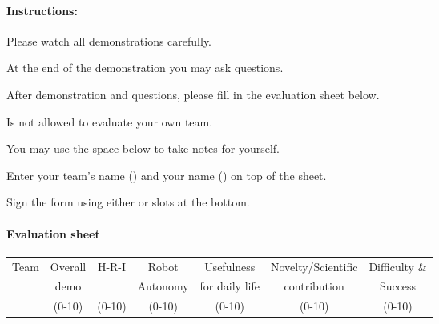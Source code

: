 \paragraph{Instructions:}
\begin{compactenum}
\item Please watch all demonstrations carefully.
\item At the end of the demonstration you may ask questions.
\item After demonstration and questions, please fill in the evaluation sheet below.
\item Is not allowed to evaluate your own team.
\item You may use the space below  to take notes for yourself.
\item Enter your team's name () and your name () on top of the sheet.
\item Sign the form using either  or  slots at the bottom.
\end{compactenum}

\paragraph{Evaluation sheet}
\begin{center}
\begingroup
\newcommand\tableTEAMS{}
\def\do#1{\appto\tableTEAMS{#1 & & & & & &  \\\hline}}%
\expandafter\docsvlist\expandafter{\TEAMSSTAGETWO}
\begin{tabular}{|l|c|c|c|c|c|c|}
  \hline
  \multirow{3}{*}{Team}
  &  Overall &  H-R-I  &   Robot   &   Usefulness   & Novelty/Scientific & Difficulty \&  \\
  &   demo   &         &  Autonomy & for daily life &    contribution    &    Success     \\
  &  (0-10)  & (0-10)  &   (0-10)  &     (0-10)     &       (0-10)       & (0-10)         \\
  \hline
  \hline
  \tableTEAMS
\end{tabular}
\endgroup
\end{center}

